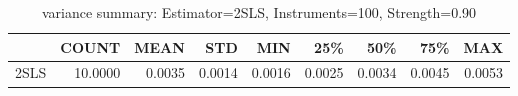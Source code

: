 \begin{table}[ht]
\centering
\caption{variance summary: Estimator=2SLS, Instruments=100, Strength=0.90}
\begin{tabular}{lrrrrrrrr}
\toprule
 & COUNT & MEAN & STD & MIN & 25\% & 50\% & 75\% & MAX \\
\midrule
2SLS & 10.0000 & 0.0035 & 0.0014 & 0.0016 & 0.0025 & 0.0034 & 0.0045 & 0.0053 \\
\bottomrule
\end{tabular}
\end{table}
